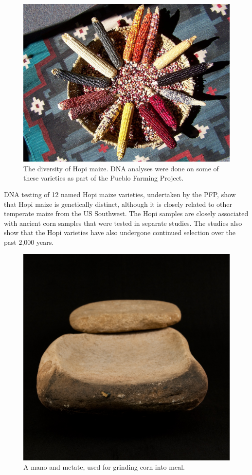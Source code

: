 \documentclass[12pt,]{article}
\begin{document}
\begin{figure}
\centering
\includegraphics{./images/section_2.3_header.jpg}
\caption{The diversity of Hopi maize. DNA analyses were done on some of these varieties as part of the Pueblo Farming Project.}
\end{figure}

DNA testing of 12 named Hopi maize varieties, undertaken by the PFP, show that Hopi maize is genetically distinct, although it is closely related to other temperate maize from the US Southwest. The Hopi samples are closely associated with ancient corn samples that were tested in separate studies. The studies also show that the Hopi varieties have also undergone continued selection over the past 2,000 years.

\begin{figure}
\centering
\includegraphics{./images/chapter_6_mano.jpg}
\caption{A mano and metate, used for grinding corn into meal.}
\end{figure}
\end{document}
